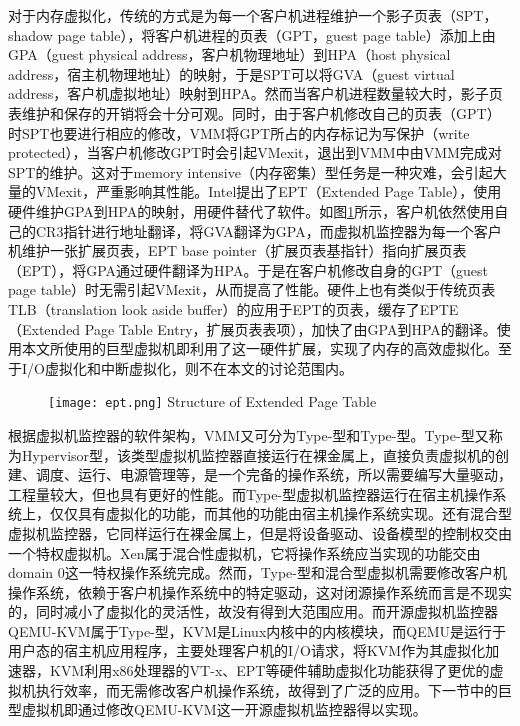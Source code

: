 对于内存虚拟化，传统的方式是为每一个客户机进程维护一个影子页表（SPT，shadow page table），将客户机进程的页表（GPT，guest page table）添加上由GPA（guest physical address，客户机物理地址）到HPA（host physical address，宿主机物理地址）的映射，于是SPT可以将GVA（guest virtual address，客户机虚拟地址）映射到HPA。然而当客户机进程数量较大时，影子页表维护和保存的开销将会十分可观。同时，由于客户机修改自己的页表（GPT）时SPT也要进行相应的修改，VMM将GPT所占的内存标记为写保护（write protected），当客户机修改GPT时会引起VMexit，退出到VMM中由VMM完成对SPT的维护。这对于memory intensive（内存密集）型任务是一种灾难，会引起大量的VMexit，严重影响其性能。Intel提出了EPT（Extended Page Table），使用硬件维护GPA到HPA的映射，用硬件替代了软件。如图\ref{fig:EPT}所示，客户机依然使用自己的CR3指针进行地址翻译，将GVA翻译为GPA，而虚拟机监控器为每一个客户机维护一张扩展页表，EPT base pointer（扩展页表基指针）指向扩展页表（EPT），将GPA通过硬件翻译为HPA。于是在客户机修改自身的GPT（guest page table）时无需引起VMexit，从而提高了性能。硬件上也有类似于传统页表TLB（translation look aside buffer）的应用于EPT的页表，缓存了EPTE（Extended Page Table Entry，扩展页表表项），加快了由GPA到HPA的翻译。使用本文所使用的巨型虚拟机即利用了这一硬件扩展，实现了内存的高效虚拟化。至于I/O虚拟化和中断虚拟化，则不在本文的讨论范围内。

\begin{figure}[!htp]
  \centering
  \texttt{[image: ept.png]}
    {Structure of Extended Page Table}
  \label{fig:EPT}
\end{figure}

根据虚拟机监控器的软件架构，VMM又可分为Type-\uppercase\expandafter{}型和Type-\uppercase\expandafter{}型。Type-\uppercase\expandafter{}型又称为Hypervisor型，该类型虚拟机监控器直接运行在裸金属上，直接负责虚拟机的创建、调度、运行、电源管理等，是一个完备的操作系统，所以需要编写大量驱动，工程量较大，但也具有更好的性能。而Type-\uppercase\expandafter{}型虚拟机监控器运行在宿主机操作系统上，仅仅具有虚拟化的功能，而其他的功能由宿主机操作系统实现。还有混合型虚拟机监控器，它同样运行在裸金属上，但是将设备驱动、设备模型的控制权交由一个特权虚拟机。Xen属于混合性虚拟机，它将操作系统应当实现的功能交由domain 0这一特权操作系统完成。然而，Type-\uppercase\expandafter{}型和混合型虚拟机需要修改客户机操作系统，依赖于客户机操作系统中的特定驱动，这对闭源操作系统而言是不现实的，同时减小了虚拟化的灵活性，故没有得到大范围应用。而开源虚拟机监控器QEMU-KVM属于Type-\uppercase\expandafter{}型，KVM\cite{KVM}是Linux内核中的内核模块，而QEMU\cite{QEMU}是运行于用户态的宿主机应用程序，主要处理客户机的I/O请求，将KVM作为其虚拟化加速器，KVM利用x86处理器的VT-x、EPT等硬件辅助虚拟化功能获得了更优的虚拟机执行效率，而无需修改客户机操作系统，故得到了广泛的应用。下一节中的巨型虚拟机即通过修改QEMU-KVM这一开源虚拟机监控器得以实现。

